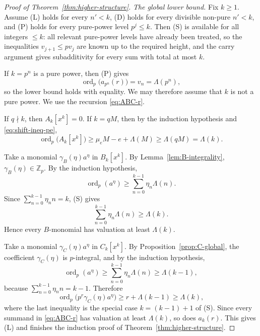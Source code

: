 \documentclass[11pt]{amsart}
\numberwithin{equation}{section}
\DeclareMathOperator{\ordop}{ord}
\newcommand{\Zp}{\mathbb{Z}_p}
\newcommand{\vp}{\ordop_p}
\begin{document}
\begin{proof}[Proof of Theorem~\ref{thm:higher-structure}]
\smallskip
\noindent\emph{The global lower bound.}
Fix $k\ge1$.  Assume (L) holds for every $n'<k$, (D) holds for every divisible non-pure $n'<k$, and (P) holds for every pure-power level $p^j\le k$.  Then (S) is available for all integers $\le k$: all relevant pure-power levels have already been treated, so the inequalities $v_{j+1}\le p v_j$ are known up to the required height, and the carry argument gives subadditivity for every sum with total at most $k$.

If $k=p^n$ is a pure power, then (P) gives
\[
        \vp\bigl(a_{p^n}(r)\bigr)=v_n=\Lambda(p^n),
\]
so the lower bound holds with equality.  We may therefore assume that $k$ is not a pure power.  We use the recursion \eqref{eq:ABC-r}.

If $q\nmid k$, then $A_k[x^k]=0$.  If $k=qM$, then by the induction hypothesis and \eqref{eq:shift-ineq-pe},
\[
        \vp\bigl(A_k[x^k]\bigr)\ge \mu_eM-e+\Lambda(M)\ge \Lambda(qM)=\Lambda(k).
\]

Take a monomial $\gamma_B(\eta)a^\eta$ in $B_k[x^k]$.  By Lemma~\ref{lem:B-integrality}, $\gamma_B(\eta)\in\Zp$.  By the induction hypothesis,
\[
        \vp(a^\eta)\ge \sum_{n=0}^{k-1}\eta_n\Lambda(n).
\]
Since $\sum_{n=0}^{k-1}\eta_n n=k$, (S) gives
\[
        \sum_{n=0}^{k-1}\eta_n\Lambda(n)\ge \Lambda(k).
\]
Hence every $B$-monomial has valuation at least $\Lambda(k)$.

Take a monomial $\gamma_C(\eta)a^\eta$ in $C_k[x^k]$.  By Proposition~\ref{prop:C-global}, the coefficient $\gamma_C(\eta)$ is $p$-integral, and by the induction hypothesis,
\[
        \vp(a^\eta)\ge \sum_{n=0}^{k-1}\eta_n\Lambda(n)\ge \Lambda(k-1),
\]
because $\sum_{n=0}^{k-1}\eta_n n=k-1$.  Therefore
\[
        \vp\bigl(p^r\gamma_C(\eta)a^\eta\bigr)
        \ge r+\Lambda(k-1)\ge \Lambda(k),
\]
where the last inequality is the special case $k=(k-1)+1$ of (S).  Since every summand in \eqref{eq:ABC-r} has valuation at least $\Lambda(k)$, so does $a_k(r)$.  This gives (L) and finishes the induction proof of Theorem~\ref{thm:higher-structure}.
\end{proof}
\end{document}
